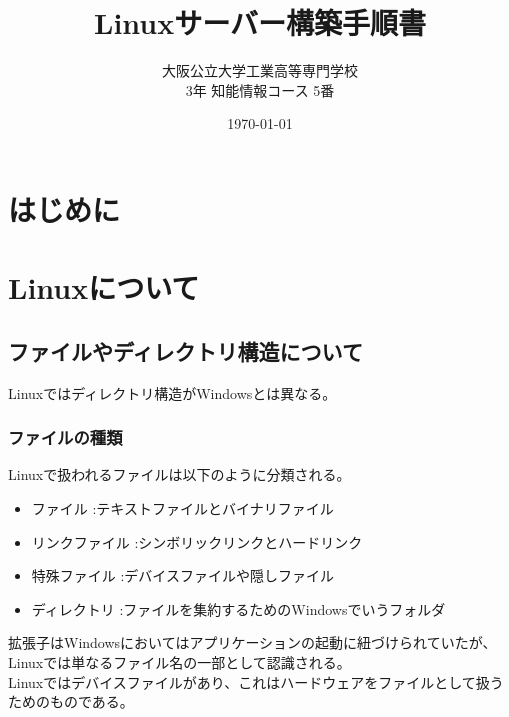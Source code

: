 \documentclass[a4paper, 11pt, dvipdfmx]{jsarticle}
\begin{document}
\title{Linuxサーバー構築手順書}
\author{大阪公立大学工業高等専門学校\\
3年 知能情報コース 5番\\
}
\date{\today}
\maketitle\thispagestyle{empty}
\newpage
\tableofcontents

\newpage
\setcounter{section}{-1}

\section{はじめに}

\section{Linuxについて}
\subsection{ファイルやディレクトリ構造について}
Linuxではディレクトリ構造がWindowsとは異なる。
\subsubsection{ファイルの種類}
  Linuxで扱われるファイルは以下のように分類される。
  \begin{itemize}
    \item ファイル     :テキストファイルとバイナリファイル
    \item リンクファイル :シンボリックリンクとハードリンク
    \item 特殊ファイル  :デバイスファイルや隠しファイル
    \item ディレクトリ  :ファイルを集約するためのWindowsでいうフォルダ
  \end{itemize}
  拡張子はWindowsにおいてはアプリケーションの起動に紐づけられていたが、Linuxでは単なるファイル名の一部として認識される。\\
  Linuxではデバイスファイルがあり、これはハードウェアをファイルとして扱うためのものである。\\
\end{document}
